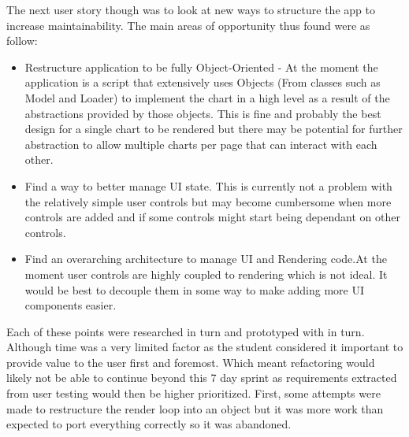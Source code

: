 The next user story though was to look at new ways to structure the app to increase maintainability. The main areas of opportunity thus found were as follow:
\begin{itemize}
    \item Restructure application to be fully Object-Oriented - At the moment the application is a script that extensively uses Objects (From classes such as Model and Loader) to implement the chart in a high level as a result of the abstractions provided by those objects. This is fine and probably the best design for a single chart to be rendered but there may be potential for further abstraction to allow multiple charts per page that can interact with each other.
    \item Find a way to better manage UI state. This is currently not a problem with the relatively simple user controls but may become cumbersome when more controls are added and if some controls might start being dependant on other controls.
    \item Find an overarching architecture to manage UI and Rendering code.At the moment user controls are highly coupled to rendering which is not ideal. It would be best to decouple them in some way to make adding more UI components easier.
\end{itemize}

Each of these points were researched in turn and prototyped with in turn. Although time was a very limited factor as the student considered it important to provide value to the user first and foremost. Which meant refactoring would likely not be able to continue beyond this 7 day sprint as requirements extracted from user testing would then be higher prioritized. First, some attempts were made to restructure the render loop into an object but it was more work than expected to port everything correctly so it was abandoned.

